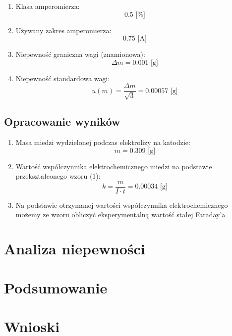 \documentclass[a4paper,12pts]{article}
\begin{document}
	\begin{enumerate}
		\item Klasa amperomierza: 
			$$0.5 \textrm{ [\%]}$$
		\item Używany zakres amperomierza: 
			$$0.75 \textrm{ [A]}$$
		\item Niepewność graniczna wagi (znamionowa): 
			$$\Delta m = 0.001 \textrm{ [g]}$$
		\item Niepewność standardowa wagi: 
			$$u(m) = \frac{\Delta m}{\sqrt{3}} = 0.00057 \textrm{ [g]}$$
	\end{enumerate}

	
	\subsection{Opracowanie wyników}
	
	\begin{enumerate}
		\item Masa miedzi wydzielonej podczas elektrolizy na katodzie:
			$$m = 0.309 \textrm{ [g]}$$
		\item Wartość współczynnika elektrochemicznego miedzi na podstawie przekształconego wzoru (1): 
			$$k = \frac{m}{I \cdot t} = 0.00034 \textrm{ [g]}$$
		\item Na podstawie otrzymanej wartości współczynnika elektrochemicznego możemy ze wzoru  obliczyć eksperymentalną wartość stałej Faraday'a	
	\end{enumerate}
	
	
	
	\section{Analiza niepewności}
	

	\section{Podsumowanie}

	
	\section{Wnioski}
\end{document}
